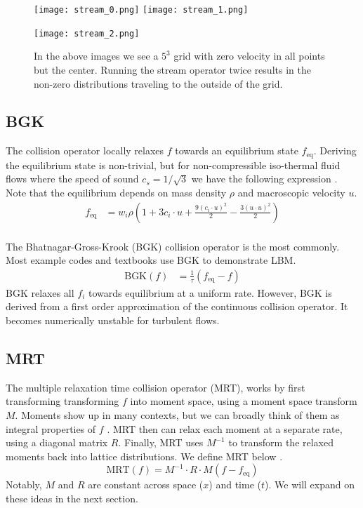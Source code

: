\begin{figure}
  \begin{center}
    \texttt{[image: stream\_0.png]}
    \texttt{[image: stream\_1.png]}

    \texttt{[image: stream\_2.png]}
  \end{center}
  \caption{In the above images we see a $5^3$ grid with zero
  velocity in all points but the center.
Running the stream operator twice results in the 
non-zero distributions traveling to the outside of the grid.}
\label{fig:stream_example}
\end{figure}

\subsection{BGK}
The collision operator locally relaxes $f$ towards
an equilibrium state $f_{\text{eq}}$.
Deriving the equilibrium state is non-trivial,
but for non-compressible iso-thermal fluid flows
where the speed of sound $c_s = 1 / \sqrt{3}$ we 
have the following expression \cite{Kruger2018}.
Note that the equilibrium depends on mass density $\rho$ and 
macroscopic velocity $u$.
\begin{align*}
   f_{\text{eq}} &= w_i \rho \left(
1 + 3 c_i \cdot u  + \frac{9 (c_i \cdot u)^2}{2}
- \frac{3 (u \cdot u)^2}{2}\right) \\
\end{align*}

The Bhatnagar-Gross-Krook (BGK) collision operator
is the most commonly.
Most example codes and textbooks use BGK to demonstrate
LBM.
\begin{align*}
    \text{BGK}(f) &= \frac{1}{\tau} (f_{\text{eq}} - f)
\end{align*}
BGK relaxes all $f_i$ towards equilibrium at a uniform rate.
However, BGK is derived from a first order approximation
of the continuous collision operator.
It becomes numerically unstable for turbulent flows.

\subsection{MRT}

The multiple relaxation time collision operator (MRT),
works by first transforming transforming $f$ into moment space,
using a moment space transform $M$.
Moments show up in many contexts, but we can broadly think of them
as integral properties of $f$ \cite{Taber2018}.
MRT then can relax each moment at a separate rate, using a diagonal matrix $R$.
Finally, MRT uses $M^{-1}$ to transform the relaxed moments
back into lattice distributions. We define MRT below \cite{De2017}.
$$
\text{MRT}(f) = M^{-1} \cdot R \cdot M (f - f_{\text{eq}})
$$
Notably, $M$ and $R$ are constant across space ($x$) and time ($t$).
We will expand on these ideas in the next section.

